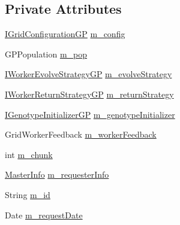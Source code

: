 \subsection*{Private Attributes}
\begin{DoxyCompactItemize}
\item 
\hyperlink{interfaceorg_1_1jgap_1_1distr_1_1grid_1_1gp_1_1_i_grid_configuration_g_p}{I\-Grid\-Configuration\-G\-P} \hyperlink{classorg_1_1jgap_1_1distr_1_1grid_1_1gp_1_1_j_g_a_p_request_g_p_a05cfc36865ece8db007b053836af3b5c}{m\-\_\-config}
\item 
G\-P\-Population \hyperlink{classorg_1_1jgap_1_1distr_1_1grid_1_1gp_1_1_j_g_a_p_request_g_p_ab224bd8c2ec67ac51a952099b410dccc}{m\-\_\-pop}
\item 
\hyperlink{interfaceorg_1_1jgap_1_1distr_1_1grid_1_1gp_1_1_i_worker_evolve_strategy_g_p}{I\-Worker\-Evolve\-Strategy\-G\-P} \hyperlink{classorg_1_1jgap_1_1distr_1_1grid_1_1gp_1_1_j_g_a_p_request_g_p_a88f1eedbcbaffbbe37826ea3981363b2}{m\-\_\-evolve\-Strategy}
\item 
\hyperlink{interfaceorg_1_1jgap_1_1distr_1_1grid_1_1gp_1_1_i_worker_return_strategy_g_p}{I\-Worker\-Return\-Strategy\-G\-P} \hyperlink{classorg_1_1jgap_1_1distr_1_1grid_1_1gp_1_1_j_g_a_p_request_g_p_a2b6926f0a00acd62c1506c51236e4fb8}{m\-\_\-return\-Strategy}
\item 
\hyperlink{interfaceorg_1_1jgap_1_1distr_1_1grid_1_1gp_1_1_i_genotype_initializer_g_p}{I\-Genotype\-Initializer\-G\-P} \hyperlink{classorg_1_1jgap_1_1distr_1_1grid_1_1gp_1_1_j_g_a_p_request_g_p_aa7117a0cd7be0629bdb2e8bfee8ae746}{m\-\_\-genotype\-Initializer}
\item 
Grid\-Worker\-Feedback \hyperlink{classorg_1_1jgap_1_1distr_1_1grid_1_1gp_1_1_j_g_a_p_request_g_p_a21597f0b0cea30f196246948fc8d3c93}{m\-\_\-worker\-Feedback}
\item 
int \hyperlink{classorg_1_1jgap_1_1distr_1_1grid_1_1gp_1_1_j_g_a_p_request_g_p_a6ecaefdb003bc276f2b6063608e12e89}{m\-\_\-chunk}
\item 
\hyperlink{classorg_1_1jgap_1_1distr_1_1_master_info}{Master\-Info} \hyperlink{classorg_1_1jgap_1_1distr_1_1grid_1_1gp_1_1_j_g_a_p_request_g_p_a2aa01ccde2e53d9ad7e60abaf2ab7813}{m\-\_\-requester\-Info}
\item 
String \hyperlink{classorg_1_1jgap_1_1distr_1_1grid_1_1gp_1_1_j_g_a_p_request_g_p_a05d61a2d16680fbb070e2d8cacf881fc}{m\-\_\-id}
\item 
Date \hyperlink{classorg_1_1jgap_1_1distr_1_1grid_1_1gp_1_1_j_g_a_p_request_g_p_a35c3e293e95525b2666660c87dbd1edb}{m\-\_\-request\-Date}

\end{DoxyCompactItemize}
